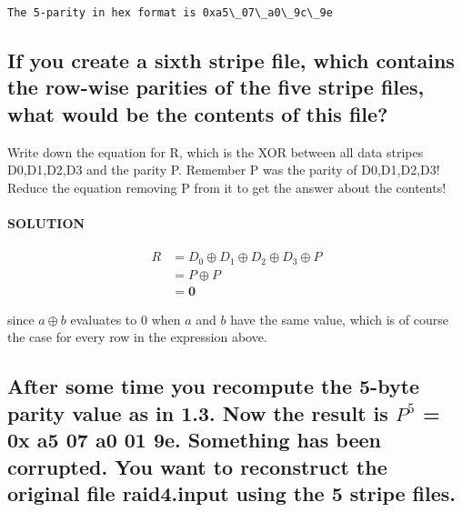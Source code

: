 \documentclass[11pt]{article}
\begin{document}
    \begin{Verbatim}[commandchars=\\\{\}]
The 5-parity in hex format is 0xa5\_07\_a0\_9c\_9e
    \end{Verbatim}

    \hypertarget{if-you-create-a-sixth-stripe-file-which-contains-the-row-wise-parities-of-the-five-stripe-files-what-would-be-the-contents-of-this-file}{%
\subsection{If you create a sixth stripe file, which contains the
row-wise parities of the five stripe files, what would be the contents
of this
file?}\label{if-you-create-a-sixth-stripe-file-which-contains-the-row-wise-parities-of-the-five-stripe-files-what-would-be-the-contents-of-this-file}}

    Write down the equation for R, which is the XOR between all data stripes
D0,D1,D2,D3 and the parity P. Remember P was the parity of D0,D1,D2,D3!
Reduce the equation removing P from it to get the answer about the
contents!

    \hypertarget{solution}{%
\paragraph{SOLUTION}\label{solution}}

\begin{align*}
R &= D_0\oplus D_1\oplus D_2\oplus D_3\oplus P\\
&= P\oplus P\\
&= \mathbf{0}
\end{align*}

since \(a\oplus b\) evaluates to \(0\) when \(a\) and \(b\) have the
same value, which is of course the case for every row in the expression
above.

    \hypertarget{after-some-time-you-recompute-the-5-byte-parity-value-as-in-1.3.-now-the-result-is-p5-0x-a5-07-a0-01-9e.-something-has-been-corrupted.-you-want-to-reconstruct-the-original-file-raid4.input-using-the-5-stripe-files.}{%
\subsection{\texorpdfstring{After some time you recompute the
5-byte parity value as in 1.3. Now the result is \(P^5\) = 0x a5 07 a0
01 9e. Something has been corrupted. You want to reconstruct the
original file raid4.input using the 5 stripe
files.}{1.5 After some time you recompute the 5-byte parity value as in 1.3. Now the result is P\^{}5 = 0x a5 07 a0 01 9e. Something has been corrupted. You want to reconstruct the original file raid4.input using the 5 stripe files.}}\label{after-some-time-you-recompute-the-5-byte-parity-value-as-in-1.3.-now-the-result-is-p5-0x-a5-07-a0-01-9e.-something-has-been-corrupted.-you-want-to-reconstruct-the-original-file-raid4.input-using-the-5-stripe-files.}}
\end{document}
